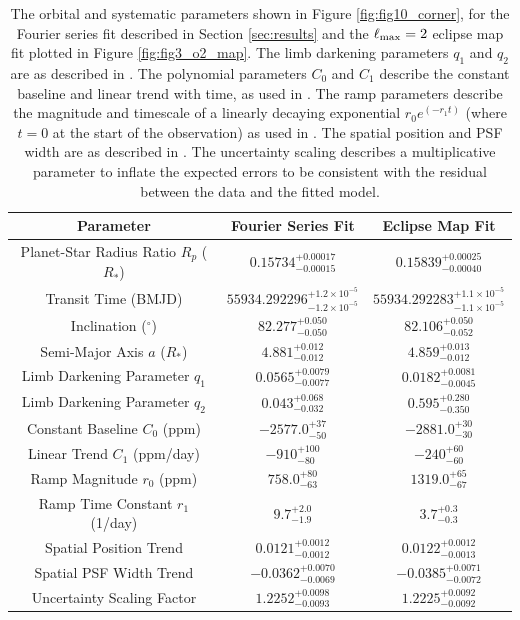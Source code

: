 \documentclass[twocolumn]{aastex631}
\begin{document}
\begin{table}
    \centering
    \begin{tabular}{c|cc}
        \textbf{Parameter} & \textbf{Fourier Series Fit} & \textbf{Eclipse Map Fit}\\
        \hline
Planet-Star Radius Ratio $R_{p}$ ($R_{*}$) & $ 0.15734 ^{+ 0.00017 } _{- 0.00015 }$ & $ 0.15839 ^{+ 0.00025 } _{- 0.00040 }$ \\
Transit Time (BMJD) & $ 55934.292296 ^{+ 1.2 \times 10^{-5} } _{- 1.2 \times 10^{-5} }$ & $ 55934.292283 ^{+ 1.1 \times 10^{-5} } _{- 1.1 \times 10^{-5} }$ \\
Inclination ($^{\circ}$) & $ 82.277 ^{+ 0.050 } _{- 0.050 }$ & $ 82.106 ^{+ 0.050 } _{- 0.052 }$ \\
Semi-Major Axis $a$ ($R_{*}$) & $ 4.881 ^{+ 0.012 } _{- 0.012 }$ & $ 4.859 ^{+ 0.013 } _{- 0.012 }$ \\
Limb Darkening Parameter $q_1$ & $ 0.0565 ^{+ 0.0079 } _{- 0.0077 }$ & $ 0.0182 ^{+ 0.0081 } _{- 0.0045 }$ \\
Limb Darkening Parameter $q_2$ & $ 0.043 ^{+ 0.068 } _{- 0.032 }$ & $ 0.595 ^{+ 0.280 } _{- 0.350 }$ \\
Constant Baseline $C_0$ (ppm)  & $ -2577.0 ^{+ 37 } _{- 50 }$ & $ -2881.0 ^{+ 30 } _{- 30 }$ \\
Linear Trend $C_1$ (ppm/day) & $ -910 ^{+ 100 } _{- 80 }$ & $ -240 ^{+ 60 } _{- 60 }$ \\
Ramp Magnitude $r_0$ (ppm) & $ 758.0 ^{+ 80 } _{- 63 }$ & $ 1319.0 ^{+ 65 } _{- 67 }$ \\
Ramp Time Constant $r_1$ (1/day) & $ 9.7 ^{+ 2.0 } _{- 1.9 }$ & $ 3.7 ^{+ 0.3 } _{- 0.3 }$ \\
Spatial Position Trend & $ 0.0121 ^{+ 0.0012 } _{- 0.0012 }$ & $ 0.0122 ^{+ 0.0012 } _{- 0.0013 }$ \\
Spatial PSF Width Trend & $ -0.0362 ^{+ 0.0070 } _{- 0.0069 }$ & $ -0.0385 ^{+ 0.0071 } _{- 0.0072 }$ \\
Uncertainty Scaling Factor & $ 1.2252 ^{+ 0.0098 } _{- 0.0093 }$ & $ 1.2225 ^{+ 0.0092 } _{- 0.0092 }$ \\
    \end{tabular}
    \caption{The orbital and systematic parameters shown in Figure \ref{fig:fig10_corner}, for the Fourier series fit described in Section \ref{sec:results} and the $\ell_{\rm max}=2$ eclipse map fit plotted in Figure \ref{fig:fig3_o2_map}. The limb darkening parameters $q_1$ and $q_2$ are as described in \citet{kipping2013efficient}. The polynomial parameters $C_0$ and $C_1$ describe the constant baseline and linear trend with time, as used in \citet{bell2022eureka}. The ramp parameters describe the magnitude and timescale of a linearly decaying exponential $r_{0} e^{(-r_{1}t )}$ (where $t=0$ at the start of the observation) as used in \citet{bell2022eureka}. The spatial position and PSF width are as described in \citet{bell2022eureka}. The uncertainty scaling describes a multiplicative parameter to inflate the expected errors to be consistent with the residual between the data and the fitted model.}
    \label{tab:params_table}
\end{table}
\end{document}
